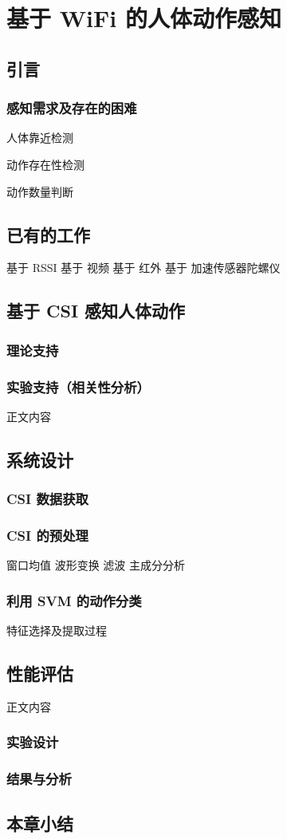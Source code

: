 \chapter{基于 WiFi 的人体动作感知}
\section{引言}
\subsection{感知需求及存在的困难}
人体靠近检测

动作存在性检测

动作数量判断

\section{已有的工作}
基于 RSSI
基于 视频
基于 红外
基于 加速传感器陀螺仪

\section{基于 CSI 感知人体动作}

\subsection{理论支持}

\subsection{实验支持（相关性分析）}
正文内容
\section{系统设计}

\subsection{CSI 数据获取}
\subsection{CSI 的预处理}
窗口均值 波形变换 滤波 主成分分析

\subsection{利用 SVM 的动作分类}

特征选择及提取过程

\section{性能评估}
正文内容
\subsection{实验设计}
\subsection{结果与分析}

\section{本章小结}